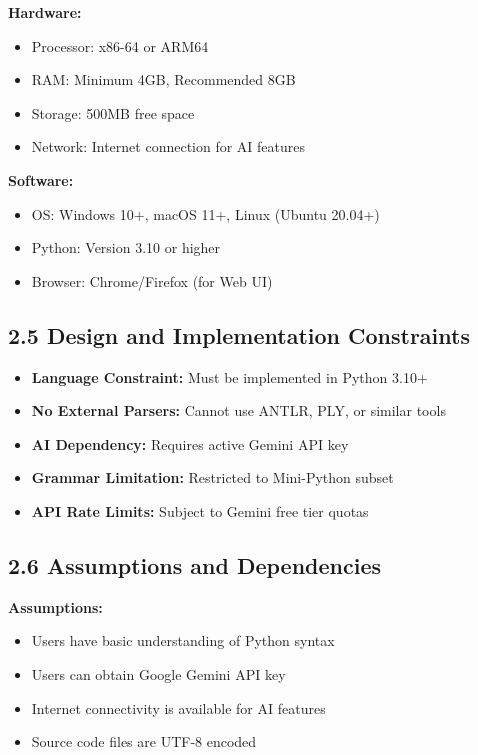 \documentclass[a4paper,11pt]{article}
\begin{document}
\textbf{Hardware:}
\begin{itemize}
    \item Processor: x86-64 or ARM64
    \item RAM: Minimum 4GB, Recommended 8GB
    \item Storage: 500MB free space
    \item Network: Internet connection for AI features
\end{itemize}

\textbf{Software:}
\begin{itemize}
    \item OS: Windows 10+, macOS 11+, Linux (Ubuntu 20.04+)
    \item Python: Version 3.10 or higher
    \item Browser: Chrome/Firefox (for Web UI)
\end{itemize}

\subsection{2.5 Design and Implementation Constraints}

\begin{itemize}
    \item \textbf{Language Constraint:} Must be implemented in Python 3.10+
    \item \textbf{No External Parsers:} Cannot use ANTLR, PLY, or similar tools
    \item \textbf{AI Dependency:} Requires active Gemini API key
    \item \textbf{Grammar Limitation:} Restricted to Mini-Python subset
    \item \textbf{API Rate Limits:} Subject to Gemini free tier quotas
\end{itemize}

\subsection{2.6 Assumptions and Dependencies}

\textbf{Assumptions:}
\begin{itemize}
    \item Users have basic understanding of Python syntax
    \item Users can obtain Google Gemini API key
    \item Internet connectivity is available for AI features
    \item Source code files are UTF-8 encoded
\end{itemize}
\end{document}
